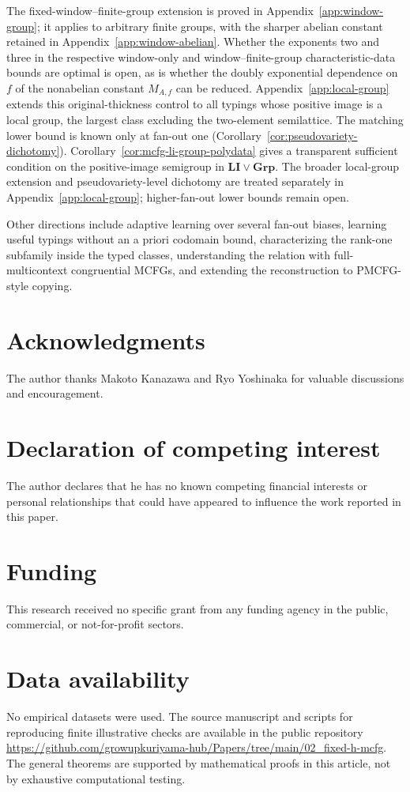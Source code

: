 The fixed-window--finite-group extension is proved in
Appendix~\ref{app:window-group}; it applies to arbitrary
finite groups, with the sharper abelian constant retained
in Appendix~\ref{app:window-abelian}.
Whether the exponents two and three in the respective
window-only and window--finite-group characteristic-data bounds
are optimal is open, as is whether the doubly exponential
dependence on $f$ of the nonabelian constant $M_{A,f}$ can be reduced.
Appendix~\ref{app:local-group} extends this original-thickness
control to all typings whose positive image is a local group, the
largest class excluding the two-element semilattice.  The matching
lower bound is known only at fan-out one
(Corollary~\ref{cor:pseudovariety-dichotomy}).
Corollary~\ref{cor:mcfg-li-group-polydata} gives a
transparent sufficient condition on the positive-image semigroup in
$\mathbf{LI}\vee\mathbf{Grp}$.  The broader local-group extension and
pseudovariety-level dichotomy are treated separately in
Appendix~\ref{app:local-group}; higher-fan-out lower bounds remain open.

Other directions include adaptive learning over several fan-out biases,
learning useful typings without an a priori codomain bound, characterizing the
rank-one subfamily inside the typed classes, understanding the relation with
full-multicontext congruential MCFGs, and extending the reconstruction to
PMCFG-style copying.

\section*{Acknowledgments}
The author thanks Makoto Kanazawa and Ryo Yoshinaka for valuable discussions
and encouragement.

\section*{Declaration of competing interest}
The author declares that he has no known competing financial interests or
personal relationships that could have appeared to influence the work reported
in this paper.

\section*{Funding}
This research received no specific grant from any funding agency in the public,
commercial, or not-for-profit sectors.

\section*{Data availability}
No empirical datasets were used. The source manuscript and scripts
for reproducing finite illustrative checks are available in the
public repository
\url{https://github.com/growupkuriyama-hub/Papers/tree/main/02_fixed-h-mcfg}.
The general theorems are supported by mathematical proofs in this article,
not by exhaustive computational testing.

